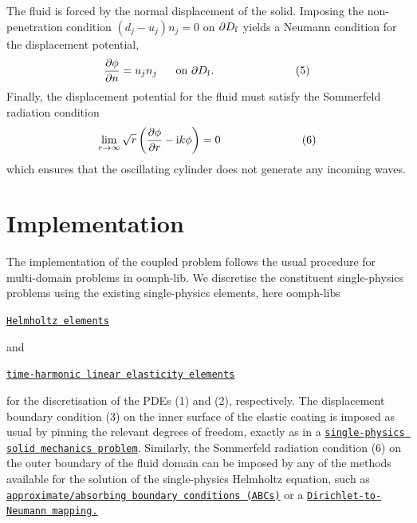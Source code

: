 The fluid is forced by the normal displacement of the solid. Imposing the non-\/penetration condition $(d_j - u_j) n_j = 0$ on $\partial D_{\rm f}$ yields a Neumann condition for the displacement potential, \[ \frac{\partial \phi}{\partial n} = u_j n_j \mbox{\ \ \ \ \ on $\partial D_{\rm f}$}. \ \ \ \ \ \ \ \ \ \ \ \ \ \ \ \ \ \ \ \ \ \ (5) \] Finally, the displacement potential for the fluid must satisfy the Sommerfeld radiation condition \[ \lim_{r \to \infty} \sqrt{r}\left( \frac{\partial \phi}{\partial r} - {\rm i} k \phi \right) = 0 \ \ \ \ \ \ \ \ \ \ \ \ \ \ \ \ \ \ \ \ \ \ (6) \] which ensures that the oscillating cylinder does not generate any incoming waves.



 

\hypertarget{index_impl}{}\section{Implementation}\label{index_impl}
The implementation of the coupled problem follows the usual procedure for multi-\/domain problems in {\ttfamily oomph-\/lib}. We discretise the constituent single-\/physics problems using the existing single-\/physics elements, here {\ttfamily oomph-\/lib\textquotesingle{}s} 
\begin{DoxyItemize}
\item \href{../../../helmholtz/scattering/html/index.html}{\tt Helmholtz elements}
\end{DoxyItemize}and
\begin{DoxyItemize}
\item \href{../../../time_harmonic_linear_elasticity/elastic_annulus/html/index.html}{\tt time-\/harmonic linear elasticity elements}
\end{DoxyItemize}for the discretisation of the P\+D\+Es (1) and (2), respectively. The displacement boundary condition (3) on the inner surface of the elastic coating is imposed as usual by pinning the relevant degrees of freedom, exactly as in a \href{../../../time_harmonic_linear_elasticity/elastic_annulus/html/index.html}{\tt single-\/physics solid mechanics problem}. Similarly, the Sommerfeld radiation condition (6) on the outer boundary of the fluid domain can be imposed by any of the methods available for the solution of the single-\/physics Helmholtz equation, such as \href{../../../helmholtz/scattering/html/index.html#ABCs}{\tt approximate/absorbing boundary conditions (A\+B\+Cs)} or a \href{../../../helmholtz/scattering/html/index.html#DtN}{\tt Dirichlet-\/to-\/\+Neumann mapping.}

